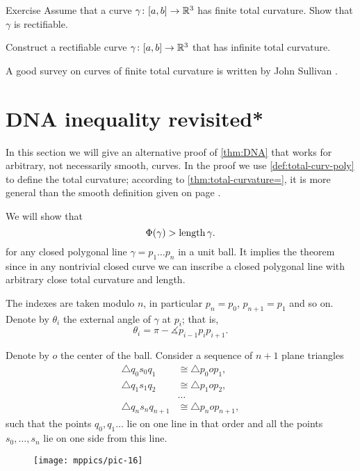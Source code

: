 \begin{thm}{Exercise} 
Assume that a curve $\gamma\colon[a,b]\to\mathbb{R}^3$ has finite total curvature.
Show that $\gamma$ is rectifiable.

Construct a rectifiable curve $\gamma\colon[a,b]\to\mathbb{R}^3$ that has infinite total curvature.
\end{thm}

A good survey on curves of finite total curvature is written by John Sullivan \cite{sullivan-curves}.

\section*{DNA inequality revisited*}

In this section we will give an alternative proof of \ref{thm:DNA} that works for arbitrary, not necessarily smooth, curves.
In the proof we use \ref{def:total-curv-poly} to define the total curvature;
according to \ref{thm:total-curvature=}, it is more general than the smooth definition given on page \pageref{page:total curvature of:smooth-def}.

We will show that 
\[\Phi({\gamma})> \mathop{\rm length}\nolimits\gamma.\]
for any closed polygonal line $\gamma=p_1\dots p_{n}$ in a unit ball.
It implies the theorem since in any nontrivial closed curve we can inscribe a closed polygonal line with arbitrary close total curvature and length.

The indexes are taken modulo $n$, in particular $p_{n}=p_0$, $p_{n+1}=p_1$ and so on.
Denote by $\theta_i$ the external angle of $\gamma$ at $p_i$;
that is,
\[\theta_i=\pi-\measuredangle p_{i-1}p_ip_{i+1}.\]

Denote by $o$ the center of the ball.
Consider a sequence of $n+1$ plane triangles
\begin{align*}
\triangle q_0s_0q_1
&\cong 
\triangle p_0op_1,
\\
\triangle q_1s_1q_2
&\cong 
\triangle p_1op_2,
\\
&\dots
\\
\triangle q_{n}s_nq_{n+1}
&\cong 
\triangle p_nop_{n+1},
\end{align*}
such that the points $q_0,q_1\dots$ lie on one line in that order and all the points $s_0,\dots,s_n$ lie on one side from this line.

\begin{figure}[h!]
\vskip-0mm
\centering
\texttt{[image: mppics/pic-16]}
\vskip0mm
\end{figure}

